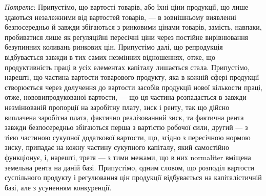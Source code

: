 \emph{Потретє}: Припустімо, що вартості товарів, або їхні ціни продукції, що
лише здаються незалежними від вартостей товарів, — в зовнішньому виявленні
безпосередньо й завжди збігаються з ринковими цінами товарів, замість, навпаки,
пробиватися лише як реґуляційні пересічні ціни через постійне вирівнювання
безупинних коливань ринкових цін. Припустімо далі, що репродукція відбувається
завжди в тих самих незмінних відношеннях, отже, що продуктивність праці в усіх
елементах капіталу лишається стала. Припустімо, нарешті, що частина вартости
товарового продукту, яка в кожній сфері продукції створюється через долучення
до вартости засобів продукції нової кількости праці, отже, нововипродукованої
вартости, — що ця частина розпадається в завжди незмінюваній пропорції на заробітну
плату, зиск і ренту, так що дійсно виплачена заробітна плата, фактично
реалізованний зиск, та фактична рента завжди безпосередньо збігаються перша
з вартістю робочої сили, другий — з тією частиною сукупної додаткової вартости,
що, згідно з пересічною нормою зиску, припадає на кожну частину сукупного
капіталу, який самостійно функціонує, і, нарешті, третя — з тими межами, що в
них normaliter вміщена земельна рента на даній базі. Припустімо, одним словом,
що розподіл вартости суспільного продукту і регулювання цін продукції відбувається
на капіталістичній базі, але з усуненням конкуренції.
